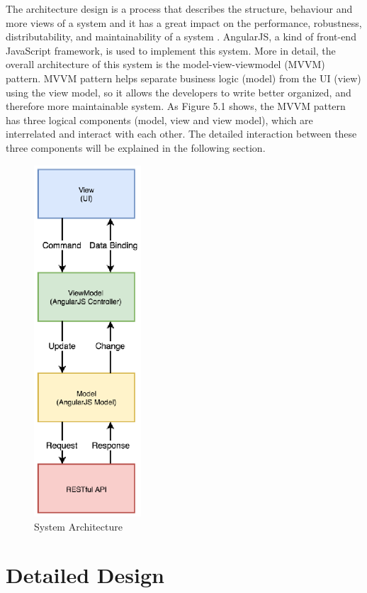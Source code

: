 The architecture design is a process that describes the structure, behaviour and more views of a system and it has a great impact on the performance, robustness, distributability, and maintainability of a system \cite{5_sommerville_2011}. AngularJS, a kind of front-end JavaScript framework, is used to implement this system. More in detail, the overall architecture of this system is the model-view-viewmodel (MVVM) pattern. MVVM pattern helps separate business logic (model) from the UI (view) using the view model, so it allows the developers to write better organized, and therefore more maintainable system. As Figure 5.1 shows, the MVVM pattern has three logical components (model, view and view model), which are interrelated and interact with each other. The detailed interaction between these three components will be explained in the following section.
\begin{figure}[H]
  \centering
  \includegraphics[width=4cm]{./img/Picture7}
  \caption{System Architecture}
  \label{Figure:figex}
\end{figure}



\section{Detailed Design}
